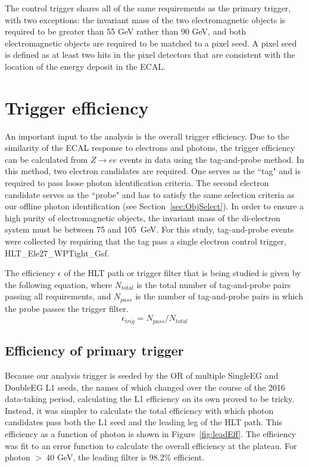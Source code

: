 The control trigger shares all of the same requirements as the primary trigger, with two exceptions: 
the invariant mass of the two electromagnetic objects is required to be greater than 55 GeV rather than 90 GeV, 
and both electromagnetic objects are required to be matched to a pixel seed. A pixel seed is defined
as at least two hits in the pixel detectors that are consistent with the location of the energy deposit in the ECAL. 


\section{Trigger efficiency}
\label{sec:trigEff}
An important input to the analysis is the overall trigger efficiency. Due to the similarity of the ECAL response 
to electrons and photons, the trigger efficiency can be calculated from 
$Z\rightarrow ee$ events in data using the tag-and-probe method. In this method, two electron candidates
are required. One serves as the ``tag" and is required to pass loose photon identification criteria. 
The second electron candidate serves
as the ``probe" and has to satisfy the same selection criteria as our offline photon identification (see Section~\ref{sec:ObjSelect}). 
In order to ensure a high purity of electromagnetic objects, the invariant mass of the di-electron system must be between 75 and 105~GeV. 
For this study, tag-and-probe events were collected by requiring that the tag pass
a single electron control trigger, HLT\_Ele27\_WPTight\_Gsf.


The efficiency $\epsilon$ of the HLT path or trigger filter that is being studied is given by the following equation, where $N_{total}$ is the total number of tag-and-probe pairs 
passing all requirements, and $N_{pass}$ is the number of tag-and-probe pairs in which  the probe passes the trigger filter.
\begin{equation}
 \epsilon_{trig} = N_{pass} / N_{total}
\end{equation}

\subsection{Efficiency of primary trigger}
\label{sec:TnP_Eff}

Because our analysis trigger is seeded by the OR of multiple SingleEG and DoubleEG L1 seeds, the names of which changed over the course of the 2016 data-taking period, calculating the L1 efficiency on its own proved to be tricky. Instead, it was simpler to calculate the total efficiency with which photon candidates pass both the L1 seed and the leading leg of the HLT path. This efficiency as a function of photon \pt is shown in Figure~\ref{fig:leadEff}. The efficiency was fit to an error function to calculate the overall efficiency at the plateau. For photon \pt $>~40$ GeV, the leading filter is 98.2\% efficient.

